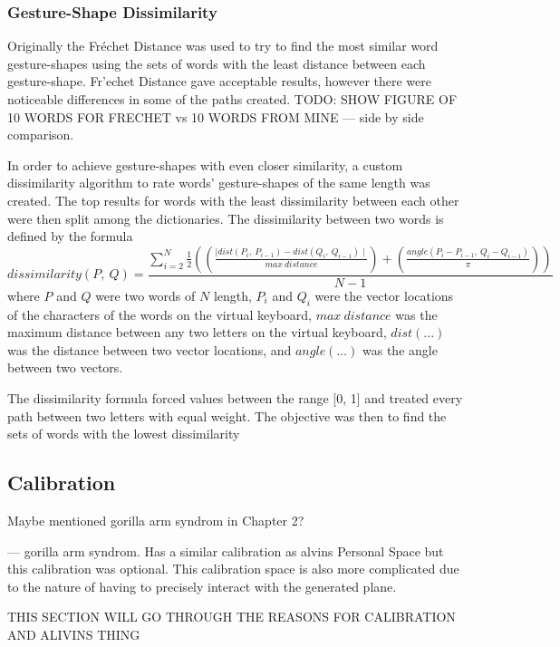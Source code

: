 \subsubsection {Gesture-Shape Dissimilarity}
Originally the Fr\'echet Distance was used to try to find the most similar word gesture-shapes using the sets of words with the least distance between each gesture-shape. Fr'echet Distance gave acceptable results, however there were noticeable differences in some of the paths created. TODO: SHOW FIGURE OF 10 WORDS FOR FRECHET vs 10 WORDS FROM MINE --- side by side comparison.

In order to achieve gesture-shapes with even closer similarity, a custom dissimilarity algorithm to rate words' gesture-shapes of the same length was created. The top results for words with the least dissimilarity between each other were then split among the dictionaries. The dissimilarity between two words is defined by the formula
\begin{equation}
dissimilarity(P,\ Q) = \frac{\sum\limits_{i = 2}^{N} \frac{1}{2} \left(\left(\frac{\mid dist(P_{i},\ P_{i-1}) - dist(Q_{i},\ Q_{i-1})\mid}{max\ distance}\right) + \left(\frac{angle(P_{i} - P_{i-1},\ Q_{i} - Q_{i-1})}{\pi}\right)\right)}{N - 1}
\end{equation}
where $P$ and $Q$ were two words of $N$ length, $P_i$ and $Q_i$ were the vector locations of the characters of the words on the virtual keyboard, $max\ distance$ was the maximum distance between any two letters on the virtual keyboard, $dist(...)$ was the distance between two vector locations, and $angle(...)$ was the angle between two vectors.

The dissimilarity formula forced values between the range [0, 1] and treated every path between two letters with equal weight. The objective was then to find the sets of words with the lowest dissimilarity

\subsection{Calibration}
Maybe mentioned gorilla arm syndrom in Chapter 2?

--- gorilla arm syndrom. Has a similar calibration as alvins Personal Space but this calibration was optional. This calibration space is also more complicated due to the nature of having to precisely interact with the generated plane.

THIS SECTION WILL GO THROUGH THE REASONS FOR CALIBRATION AND ALIVINS THING

